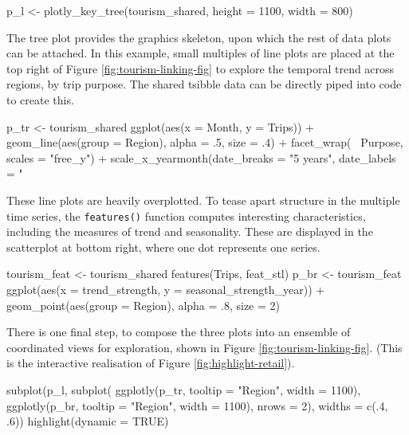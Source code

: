 \begin{Schunk}
\begin{Sinput}
p_l <- plotly_key_tree(tourism_shared, height = 1100, width = 800)
\end{Sinput}
\end{Schunk}

The tree plot provides the graphics skeleton, upon which the rest of
data plots can be attached. In this example, small multiples of line
plots are placed at the top right of Figure
\ref{fig:tourism-linking-fig} to explore the temporal trend across
regions, by trip purpose. The shared tsibble data can be directly piped
into  code to create this.

\begin{Schunk}
\begin{Sinput}
p_tr <- tourism_shared %
  ggplot(aes(x = Month, y = Trips)) +
  geom_line(aes(group = Region), alpha = .5, size = .4) +
  facet_wrap(~ Purpose, scales = "free_y") +
  scale_x_yearmonth(date_breaks = "5 years", date_labels = "%
\end{Sinput}
\end{Schunk}

These line plots are heavily overplotted. To tease apart structure in
the multiple time series, the \texttt{features()} function computes
interesting characteristics, including the measures of trend and
seasonality. These are displayed in the scatterplot at bottom right,
where one dot represents one series.

\begin{Schunk}
\begin{Sinput}
tourism_feat <- tourism_shared %
  features(Trips, feat_stl)
p_br <- tourism_feat %
  ggplot(aes(x = trend_strength, y = seasonal_strength_year)) +
  geom_point(aes(group = Region), alpha = .8, size = 2)
\end{Sinput}
\end{Schunk}

There is one final step, to compose the three plots into an ensemble of
coordinated views for exploration, shown in Figure
\ref{fig:tourism-linking-fig}. (This is the interactive realisation of
Figure \ref{fig:highlight-retail}).

\begin{Schunk}
\begin{Sinput}
subplot(p_l,
  subplot(
    ggplotly(p_tr, tooltip = "Region", width = 1100),
    ggplotly(p_br, tooltip = "Region", width = 1100),
    nrows = 2),
  widths = c(.4, .6)) %
  highlight(dynamic = TRUE)
\end{Sinput}
\end{Schunk}

